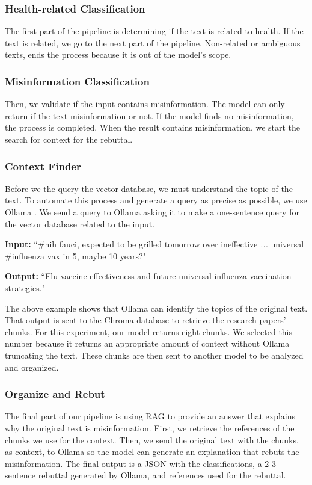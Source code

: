 \subsubsection{Health-related Classification}
The first part of the pipeline is determining if the text is related to health. If the text is related, we go to the next part of the pipeline. Non-related or ambiguous texts, ends the process because it is out of the model's scope. 

\subsubsection{Misinformation Classification}
Then, we validate if the input contains misinformation. The model can only return if the text misinformation or not. If the model finds no misinformation, the process is completed. When the result contains misinformation, we start the search for context for the rebuttal.

\subsubsection{Context Finder}
Before we the query the vector database, we must understand the topic of the text. To automate this process and generate a query as precise as possible, we use Ollama \cite{ollama}. We send a query to Ollama asking it to make a one-sentence query for the vector database related to the input.

{\footnotesize %
\begin{tcolorbox}[colback=gray!5,colframe=black!50,boxrule=0.4pt,arc=2pt,left=0.5mm,right=0.5mm,top=0.1mm,bottom=0.1mm,title=Example]
\textbf{Input:}  
``\#nih fauci, expected to be grilled tomorrow over ineffective \textit{...} universal \#influenza vax in 5, maybe 10 years?"

\vspace{0.25em}
\textbf{Output:}  
``Flu vaccine effectiveness and future universal influenza vaccination strategies."
\end{tcolorbox}
}
\indent The above example shows that Ollama can identify the topics of the original text. That output is sent to the Chroma database to retrieve the research papers' chunks. For this experiment, our model returns eight chunks. We selected
this number because it returns an appropriate amount of context without Ollama truncating the text. These chunks are then sent to another model to be analyzed and organized.

\subsubsection{Organize and Rebut}
The final part of our pipeline is using RAG to provide an answer that explains why the original text is misinformation. First, we retrieve the references of the chunks we use for the context. Then, we send the original text with the chunks, as context, to Ollama so the model can generate an explanation that rebuts the misinformation. The final output is a JSON with the classifications, a 2-3 sentence rebuttal generated by Ollama, and references used for the rebuttal.

